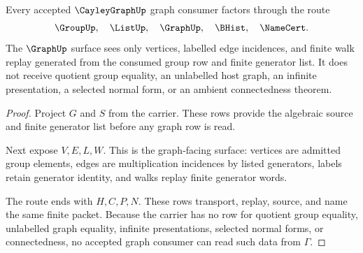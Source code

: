 \begin{theorem}
\label{thm:cayley-graph-graph-group-route}
Every accepted $\CayleyGraphUp$ graph consumer factors through the route
$$
\GroupUp,\quad
\ListUp,\quad
\GraphUp,\quad
\BHist,\quad
\NameCert .
$$
The $\GraphUp$ surface sees only vertices, labelled edge incidences, and finite walk replay generated from the consumed group row and finite generator list. It does not receive quotient group equality, an unlabelled host graph, an infinite presentation, a selected normal form, or an ambient connectedness theorem.
\end{theorem}
\begin{proof}
Project $G$ and $S$ from the carrier. These rows provide the algebraic source and finite generator list before any graph row is read.

Next expose $V,E,L,W$. This is the graph-facing surface: vertices are admitted group elements, edges are multiplication incidences by listed generators, labels retain generator identity, and walks replay finite generator words.

The route ends with $H,C,P,N$. These rows transport, replay, source, and name the same finite packet. Because the carrier has no row for quotient group equality, unlabelled graph equality, infinite presentations, selected normal forms, or connectedness, no accepted graph consumer can read such data from $\Gamma$.
\end{proof}




